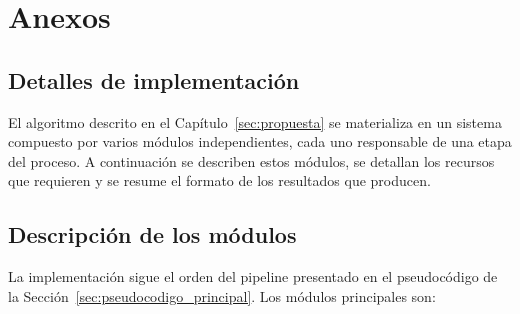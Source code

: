 \chapter{Anexos}\label{sec:anexos}

\section{Detalles de implementación}\label{sec:anexo_implementacion}

El algoritmo descrito en el Capítulo~\ref{sec:propuesta} se materializa en un sistema compuesto por varios módulos independientes, cada uno responsable de una etapa del proceso. A continuación se describen estos módulos, se detallan los recursos que requieren y se resume el formato de los resultados que producen.

\section{Descripción de los módulos} \label{sec:modulos_anexo}

La implementación sigue el orden del pipeline presentado en el pseudocódigo de la Sección~\ref{sec:pseudocodigo_principal}. Los módulos principales son:

